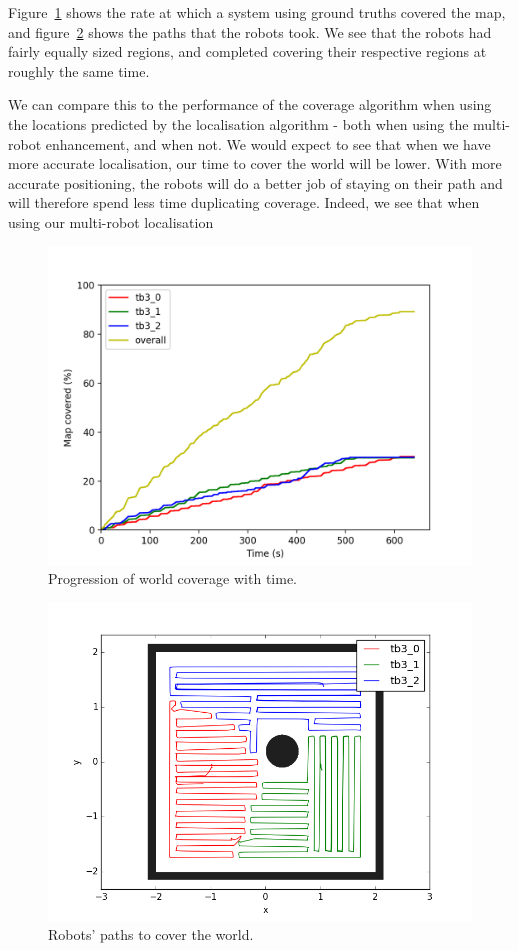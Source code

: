 \documentclass[a4paper, 10pt, conference]{ieeeconf}      %
\begin{document}
Figure~\ref{fig:ground_truth} shows the rate at which a system using ground truths covered the map, and figure~\ref{fig:ground_truth_coverage} shows the paths that the robots took. We see that the robots had fairly equally sized regions, and completed covering their respective regions at roughly the same time.

We can compare this to the performance of the coverage algorithm when using the locations predicted by the localisation algorithm - both when using the multi-robot enhancement, and when not. We would expect to see that when we have more accurate localisation, our time to cover the world will be lower. With more accurate positioning, the robots will do a better job of staying on their path and will therefore spend less time duplicating coverage. Indeed, we see that when using our multi-robot localisation

\begin{figure}
	\centering
	\includegraphics[width=\columnwidth]{ground_truth.png}
	\caption{Progression of world coverage with time.}
	\label{fig:ground_truth}
\end{figure}

\begin{figure}
	\centering
	\includegraphics[width=\columnwidth]{ground_truth_coverage.png}
	\caption{Robots' paths to cover the world.}
	\label{fig:ground_truth_coverage}
\end{figure}
\end{document}
